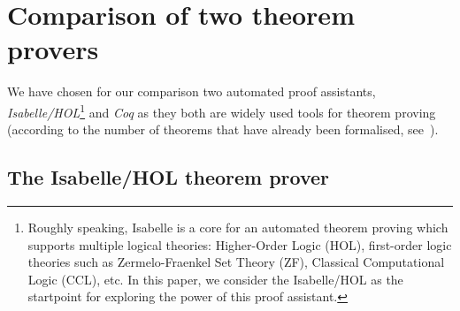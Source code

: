 \documentclass[article]{aaltoseries}
\begin{document}



		




\section{Comparison of two theorem provers}
\label{sec:comparison}

We have chosen for our comparison two automated proof assistants, \textit{Isabelle/HOL}\footnote{Roughly speaking, Isabelle is a core for an automated theorem proving which supports multiple logical theories: Higher-Order Logic (HOL), first-order logic theories such as Zermelo-Fraenkel Set Theory (ZF), Classical Computational Logic (CCL), etc. In this paper, we consider the Isabelle/HOL as the startpoint for exploring the power of this proof assistant.} and \textit{Coq} as they both are widely used tools for theorem proving (according to the number of theorems that have already been formalised, see~\cite{Wiedijk100}).



\subsection{The Isabelle/HOL theorem prover}
\label{sec:prover_isabelle}
\end{document}
